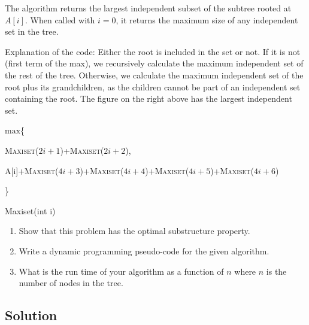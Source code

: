 The algorithm returns the largest independent subset of the subtree rooted at $A[i]$.
When called with $i=0$, it returns the maximum size of any independent set in the tree.

Explanation of the code: Either the root is included in the set or not.
If it is not (first term of the max), we recursively calculate the maximum independent set of the rest of the tree.
Otherwise, we calculate the maximum independent set of the root plus its grandchildren, as the children cannot be part of an independent set containing the root.
The figure on the right above has the largest independent set.

\begin{algorithm}[H]
\begin{algorithmic}[1]
\State {}
\EndIf
\State \Return $\text{max}$\{\par \textsc{Maxiset($2i+1$)}+\textsc{Maxiset($2i+2$)},\par A[i]+\textsc{Maxiset($4i+3$)}+\textsc{Maxiset($4i+4$)}+\textsc{Maxiset($4i+5$)}+\textsc{Maxiset($4i+6$)}\par\}
\end{algorithmic}
\caption{Maxiset(int i)}\label{alg2}
\end{algorithm}

\begin{enumerate}[label=(\alph*)]
\item Show that this problem has the optimal substructure property.
\item Write a dynamic programming pseudo-code for the given algorithm.
\item What is the run time of your algorithm as a function of $n$ where $n$ is the number of nodes in the tree.
\end{enumerate}

\subsection*{Solution}

